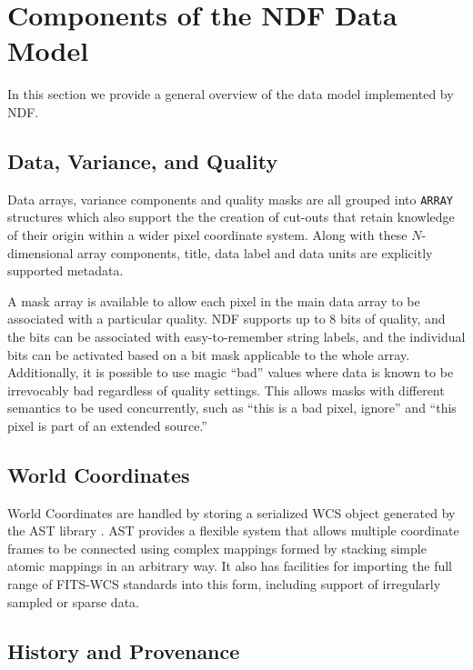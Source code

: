 \documentclass[11pt,twoside]{article}
\begin{document}
\section{Components of the NDF Data Model}

In this section we provide a general overview of the data model
implemented by NDF.

\subsection{Data, Variance, and Quality}

Data arrays, variance components and quality masks are all grouped
into \texttt{ARRAY} structures which also support the the creation of
cut-outs that retain knowledge of their origin within a wider pixel
coordinate system.  Along with these $N$-dimensional array components,
title, data label and data units are explicitly supported metadata.

A mask array is available to allow each pixel in the main data array
to be associated with a particular quality. NDF supports up to 8 bits
of quality, and the bits can be associated with easy-to-remember
string labels, and the individual bits can be activated based on a bit
mask applicable to the whole array. Additionally, it is possible to
use magic ``bad'' values where data is known to be irrevocably bad
regardless of quality settings. This allows masks with different
semantics to be used concurrently, such as ``this is a bad pixel,
ignore'' and ``this pixel is part of an extended source.''

\subsection{World Coordinates}

World Coordinates are handled by storing a serialized WCS object
generated by the AST library \citep{1998ASPC..145...41W}. AST provides
a flexible system that allows multiple coordinate frames to be
connected using complex mappings formed by stacking simple atomic
mappings in an arbitrary way. It also has facilities for importing the
full range of FITS-WCS standards \citep[see
e.g.][]{2006A&A...446..747G,2012ASPC..461..825B} into this form,
including support of irregularly sampled or sparse data.

\subsection{History and Provenance}
\end{document}
